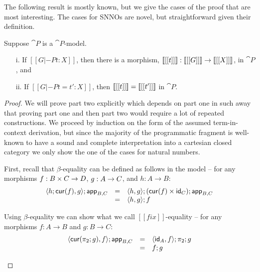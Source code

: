 The following result is mostly known, but we give the cases of the
proof that are most interesting.  The cases for SNNOs are novel, but
straightforward given their definition.
\begin{theorem}[Soundness]
  \label{theorem:P-soundness}
  Suppose $\cat{P}$ is a $\cat{P}$-model.
  \begin{itemize}
  \item[i.] If $[[G |-P t : X]]$, then there is a morphism,
    $\interp{[[t]]} : \interp{[[G]]} \mto \interp{[[X]]}$, in
    $\cat{P}$, and
  \item[ii.] If $[[G |-P t = t' : X]]$,
    then $\llbracket [[t]] \rrbracket = \llbracket [[t']] \rrbracket$ in $\cat{P}$.
  \end{itemize}
\end{theorem}
\begin{proof}
  We will prove part two explicitly which depends on part one in such
  away that proving part one and then part two would require a lot of
  repeated constructions.  We proceed by induction on the form of the
  assumed term-in-context derivation, but since the majority of the
  programmatic fragment is well-known to have a sound and complete
  interpretation into a cartesian closed category we only show the
  one of the cases for natural numbers.

  \begin{itemize}
    \begin{report}     
  First, recall that $\beta$-equality can be defined as follows in the
  model -- for any morphisms $f : B \times C \mto D$, $g : A \mto C$,
  and $h : A \to B$:
  \[
  \begin{array}{lllll}
    \langle h;\mathsf{cur}(f),g \rangle; \mathsf{app}_{B,C} & = &  \langle h,g \rangle;(\mathsf{cur}(f) \times \mathsf{id}_C);\mathsf{app}_{B,C}\\
    & = & \langle h, g\rangle;f\\
  \end{array}
  \]

  Using $\beta$-equality we can show what we call $[[fix]]$-equality --
  for any morphisms $f : A \to B$ and $g : B \to C$:
  \[
  \begin{array}{llll}
    \langle \mathsf{cur}(\pi_2;g),f \rangle;\mathsf{app}_{B,C}
    & = & \langle \mathsf{id}_A, f \rangle;\pi_2;g\\
    & = & f;g\\
  \end{array}
  \]
  

\end{report}
\end{itemize}
\end{proof}
